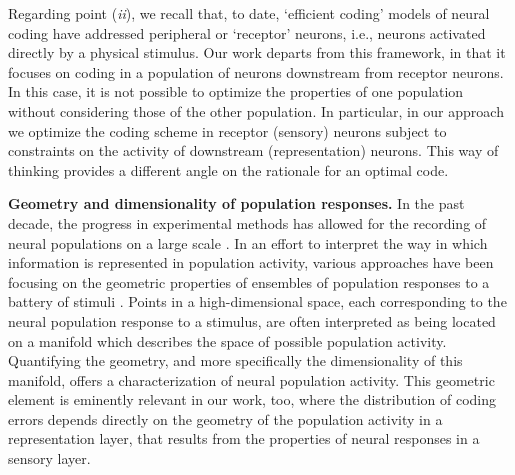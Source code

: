 \documentclass[a4paper]{article}%
\begin{document}
Regarding point (\textit{ii}), we recall that, to date, `efficient coding'
models of neural coding have addressed peripheral or `receptor' neurons, i.e.,
neurons activated directly by a physical stimulus. Our work departs from this
framework, in that it focuses on coding in a population of neurons downstream
from receptor neurons. In this case, it is not possible to optimize the
properties of one population without considering those of the other
population. In particular, in our approach we optimize the coding scheme in
receptor (sensory) neurons subject to constraints on the activity of
downstream (representation) neurons. This way of thinking provides a different
angle on the rationale for an optimal code.

\textbf{Geometry and dimensionality of population responses.} In the past
decade, the progress in experimental methods has allowed for the recording of
neural populations on a large scale
\cite[]{Cunningham2014DimensionalityRecordings,Saxena2019TowardsDoctrine}. In an
effort to interpret the way in which information is represented in population
activity, various approaches have been focusing on the geometric properties of
ensembles of population responses to a battery of stimuli
\cite[]{Fusi2016WhyCognition,Gallego2017NeuralMovement,Stringer2019HighCortex,Kobak2019State-dependentCortex}
. Points in a high-dimensional space, each corresponding to the neural
population response to a stimulus, are often interpreted as being located on a
manifold which describes the space of possible population activity.
Quantifying the geometry, and more specifically the dimensionality of this
manifold, offers a characterization of neural population activity. This
geometric element is eminently relevant in our work, too, where the
distribution of coding errors depends directly on the geometry of the
population activity in a representation layer, that results from the
properties of neural responses in a sensory layer. 
\end{document}
